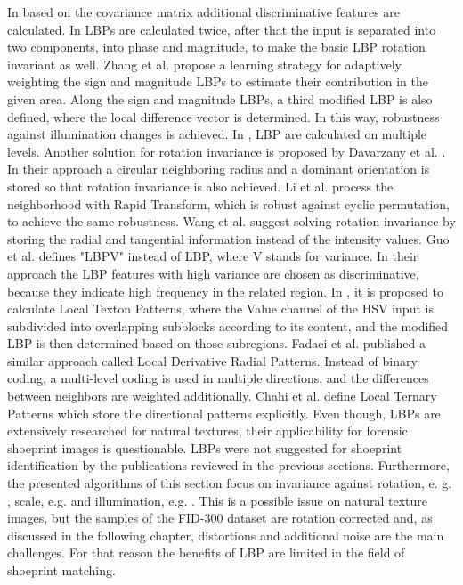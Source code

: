 \documentclass[draft,final]{vutinfth} %
\begin{document}
In \cite{hong2014combining} based on the covariance matrix additional discriminative features are calculated. 
In \cite{guo2010completed} LBPs are calculated twice, after that the input is separated into two components, into phase and magnitude, to make the basic LBP rotation invariant as well.
Zhang et al.  \cite{zhang2017learning} propose a learning strategy for adaptively weighting the sign and magnitude LBPs to estimate their contribution in the given area. 
Along the sign and magnitude LBPs, a third modified LBP is also defined, where the local difference vector is determined.
In this way, robustness against illumination changes is achieved.
In \cite{khellah2011texture}, LBP are calculated on multiple levels.
Another solution for rotation invariance is proposed by Davarzany et al. \cite{davarzani2015scale}. 
In their approach a circular neighboring radius and a dominant orientation is stored so that rotation invariance is also achieved.
Li et al. \cite{li2014rapid} process the neighborhood with Rapid Transform, which is robust against cyclic permutation, to achieve the same robustness.
Wang et al. \cite{wang2017local} suggest solving rotation invariance by storing the radial and tangential information instead of the intensity values.
Guo et al. \cite{guo2010rotation} defines "LBPV" instead of LBP, where V stands for variance. 
In their approach the LBP features with high variance are chosen as discriminative, because they indicate high frequency in the related region.
In \cite{bala2016local}, it is proposed to calculate Local Texton Patterns, where the Value channel of the HSV input is subdivided into overlapping subblocks according to its content, and the modified LBP is then determined based on those subregions.
Fadaei et al. \cite{fadaei2017local} published a similar approach called Local Derivative Radial Patterns.
Instead of binary coding, a multi-level coding is used in multiple directions, and the differences between neighbors are weighted additionally. 
Chahi et al. \cite{chahi2018local} define Local Ternary Patterns which store the directional patterns explicitly.
Even though, LBPs are extensively researched for natural textures, their applicability for forensic shoeprint images is questionable.
LBPs were not suggested for shoeprint identification by the publications reviewed in the previous sections.
Furthermore, the presented algorithms of this section focus on invariance against rotation, e. g. \cite{khellah2011texture}, scale, e.g. \cite{davarzani2015scale}  and illumination, e.g. \cite{zhang2017learning}.
This is a possible issue on natural texture images, but the samples of the FID-300 dataset are rotation corrected and, as discussed in the following chapter, distortions and additional noise are the main challenges.
For that reason the benefits of LBP are limited in the field of shoeprint matching.
\end{document}
